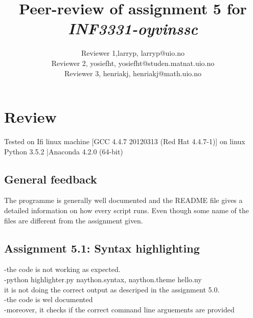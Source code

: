 \documentclass[a4paper]{article}
\title{Peer-review of assignment 5 for \textit{INF3331-oyvinssc}}
\author{Reviewer 1,larryp, {larryp@uio.no} \\
 		Reviewer 2, yosiefht, {yosiefht@studen.matnat.uio.no} \\
		Reviewer 3, henriakj, {henriakj@math.uio.no}}
\begin{document}
\maketitle






\section{Review \emph{}}\label{sec:review}

Tested on
Ifi linux machine 
[GCC 4.4.7 20120313 (Red Hat 4.4.7-1)] on linux
Python 3.5.2 |Anaconda 4.2.0 (64-bit)

\subsection*{General feedback}


The programme is generally well documented and the README file gives a detailed information on how every script runs. 
Even though some name of the files are different from the assignment given.
\subsection*{Assignment 5.1: Syntax highlighting}
-the code is not working as expected. \\ 
-python highlighter.py naython.syntax, naython.theme hello.ny \\ 
it is not doing the correct output as descriped in the assignment 5.0. \\ 
-the code is wel documented  \\
-moreover, it checks if the correct command line arguements are provided




\end{document}
